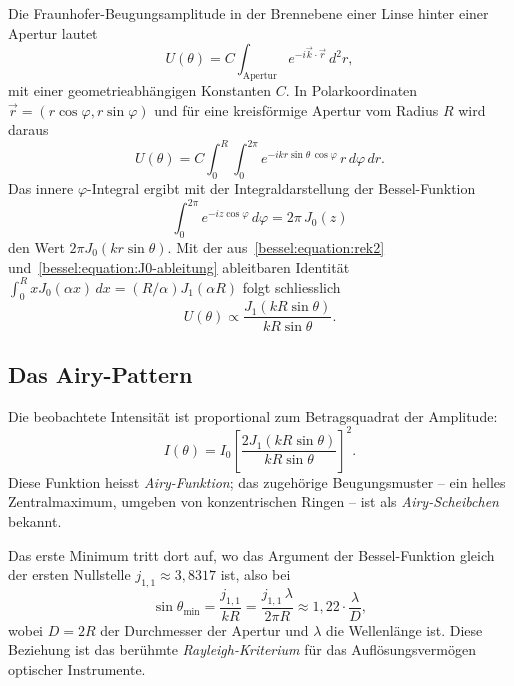 Die Fraunhofer-Beugungsamplitude in der Brennebene einer Linse hinter einer Apertur lautet
\begin{equation}
U(\theta)
=
C \int_{\text{Apertur}} e^{-i\vec k \cdot \vec r}\, d^2 r,
\label{bessel:equation:fraunhofer}
\end{equation}
mit einer geometrieabhängigen Konstanten $C$.
In Polarkoordinaten $\vec r = (r\cos\varphi, r\sin\varphi)$ und für eine kreisförmige Apertur vom Radius $R$ wird daraus
\begin{equation}
U(\theta)
=
C \int_0^R \int_0^{2\pi} e^{-i k r \sin\theta\, \cos\varphi}\, r\, d\varphi\, dr.
\end{equation}
Das innere $\varphi$-Integral ergibt mit der Integraldarstellung der Bessel-Funktion
\begin{equation}
\int_0^{2\pi} e^{-i z \cos\varphi}\, d\varphi
=
2\pi\, J_0(z)
\label{bessel:equation:integral-J0}
\end{equation}
den Wert $2\pi J_0(k r \sin\theta)$.
Mit der aus~\eqref{bessel:equation:rek2} und~\eqref{bessel:equation:J0-ableitung} ableitbaren Identität $\int_0^R x J_0(\alpha x)\, dx = (R/\alpha) J_1(\alpha R)$ folgt schliesslich
\begin{equation}
U(\theta)
\propto
\frac{J_1(k R \sin\theta)}{k R \sin\theta}.
\label{bessel:equation:amplitude}
\end{equation}

\subsection{Das Airy-Pattern
\label{bessel:subsection:airy}}

Die beobachtete Intensität ist proportional zum Betragsquadrat der Amplitude:
\begin{equation}
I(\theta)
=
I_0 \left[\frac{2 J_1(k R \sin\theta)}{k R \sin\theta}\right]^2.
\label{bessel:equation:airy}
\end{equation}
Diese Funktion heisst \emph{Airy-Funktion}; das zugehörige Beugungsmuster -- ein helles Zentralmaximum, umgeben von konzentrischen Ringen -- ist als \emph{Airy-Scheibchen} bekannt.


Das erste Minimum tritt dort auf, wo das Argument der Bessel-Funktion gleich der ersten Nullstelle $j_{1,1} \approx 3{,}8317$ ist, also bei
\begin{equation}
\sin\theta_{\min}
=
\frac{j_{1,1}}{kR}
=
\frac{j_{1,1}\, \lambda}{2\pi R}
\approx
1{,}22 \cdot \frac{\lambda}{D},
\label{bessel:equation:rayleigh}
\end{equation}
wobei $D = 2R$ der Durchmesser der Apertur und $\lambda$ die Wellenlänge ist.
Diese Beziehung ist das berühmte \emph{Rayleigh-Kriterium} für das Auflösungsvermögen optischer Instrumente.

